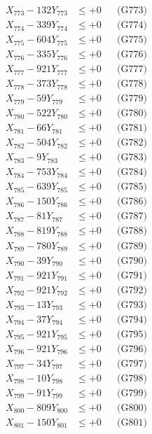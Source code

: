 \documentclass[a4paper,10pt]{article}
\begin{document}
{\begin{align}
X_{773} - 132Y_{773} &\leq +0 && \text{(G773)} \\
X_{774} - 339Y_{774} &\leq +0 && \text{(G774)} \\
X_{775} - 604Y_{775} &\leq +0 && \text{(G775)} \\
X_{776} - 335Y_{776} &\leq +0 && \text{(G776)} \\
X_{777} - 921Y_{777} &\leq +0 && \text{(G777)} \\
X_{778} - 373Y_{778} &\leq +0 && \text{(G778)} \\
X_{779} - 59Y_{779} &\leq +0 && \text{(G779)} \\
X_{780} - 522Y_{780} &\leq +0 && \text{(G780)} \\
\allowbreak
X_{781} - 66Y_{781} &\leq +0 && \text{(G781)} \\
X_{782} - 504Y_{782} &\leq +0 && \text{(G782)} \\
X_{783} - 9Y_{783} &\leq +0 && \text{(G783)} \\
X_{784} - 753Y_{784} &\leq +0 && \text{(G784)} \\
X_{785} - 639Y_{785} &\leq +0 && \text{(G785)} \\
X_{786} - 150Y_{786} &\leq +0 && \text{(G786)} \\
X_{787} - 81Y_{787} &\leq +0 && \text{(G787)} \\
X_{788} - 819Y_{788} &\leq +0 && \text{(G788)} \\
X_{789} - 780Y_{789} &\leq +0 && \text{(G789)} \\
X_{790} - 39Y_{790} &\leq +0 && \text{(G790)} \\
\allowbreak
X_{791} - 921Y_{791} &\leq +0 && \text{(G791)} \\
X_{792} - 921Y_{792} &\leq +0 && \text{(G792)} \\
X_{793} - 13Y_{793} &\leq +0 && \text{(G793)} \\
X_{794} - 37Y_{794} &\leq +0 && \text{(G794)} \\
X_{795} - 921Y_{795} &\leq +0 && \text{(G795)} \\
X_{796} - 921Y_{796} &\leq +0 && \text{(G796)} \\
X_{797} - 34Y_{797} &\leq +0 && \text{(G797)} \\
X_{798} - 10Y_{798} &\leq +0 && \text{(G798)} \\
X_{799} - 91Y_{799} &\leq +0 && \text{(G799)} \\
X_{800} - 809Y_{800} &\leq +0 && \text{(G800)} \\
\allowbreak
X_{801} - 150Y_{801} &\leq +0 && \text{(G801)} \\

\end{align}}
\end{document}
